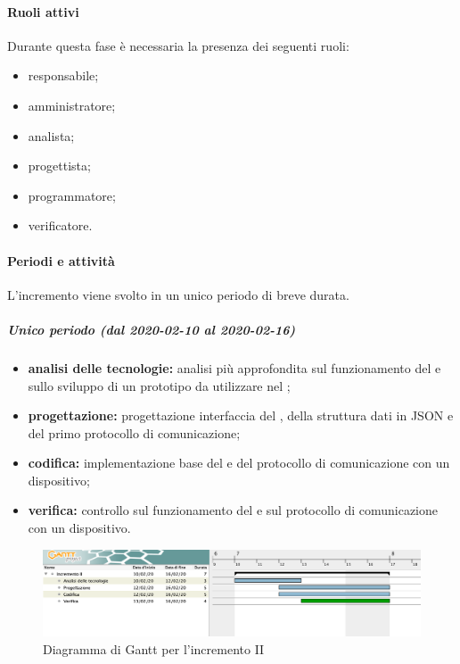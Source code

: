 			\paragraph{Ruoli attivi}
			
				Durante questa fase è necessaria la presenza dei seguenti ruoli:
				\begin{itemize}
					\item responsabile;
					\item amministratore;
					\item analista;
					\item progettista;
					\item programmatore;
					\item verificatore.
				\end{itemize}
			
			\paragraph{Periodi e attività}
			
				L'incremento viene svolto in un unico periodo di breve durata.
				
				\subparagraph{Unico periodo (dal 2020-02-10 al 2020-02-16)}
				
					\begin{itemize}
						\item \textbf{analisi delle tecnologie:} analisi più approfondita sul funzionamento del  e sullo sviluppo di un prototipo da utilizzare nel ;	
						\item \textbf{progettazione:} progettazione interfaccia del , della struttura dati in JSON e del primo protocollo di comunicazione;
						\item \textbf{codifica:} implementazione base del  e del protocollo di comunicazione con un dispositivo;
						\item \textbf{verifica:} controllo sul funzionamento del  e sul protocollo di comunicazione con un dispositivo.
					\end{itemize} 			

		\begin{landscape}
          \begin{figure}[H]
            \centering
            \includegraphics[width=\linewidth]{images/gantt/incrementoII} %
            \caption{Diagramma di Gantt per l'incremento II}
          \end{figure}		
		\end{landscape}

